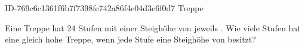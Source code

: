 \begin{exercise}
      {ID-769c6c1361f6b7f7398fe742a86f4e04d3e6f0d7}
      {Treppe}
  \ifproblem\problem\par
    Eine Treppe hat 24 Stufen mit einer Steighöhe von jeweils .
    Wie viele Stufen hat eine gleich hohe Treppe, wenn jede Stufe eine
    Steighöhe von  besitzt?
  \fi
\end{exercise}
